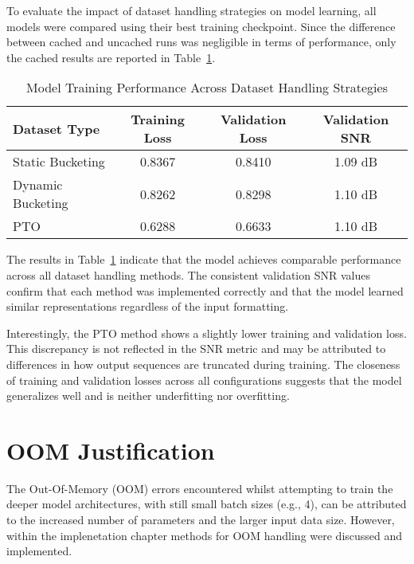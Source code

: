 To evaluate the impact of dataset handling strategies on model learning, all models were compared using their best training checkpoint. Since the difference between cached and uncached runs was negligible in terms of performance, only the cached results are reported in Table~\ref{tab:dataset_performance}.

\vspace{1em}
\begin{table}[H]
\centering
\caption{Model Training Performance Across Dataset Handling Strategies}
\label{tab:dataset_performance}
\begin{tabular}{|l|c|c|c|}
\hline
\textbf{Dataset Type} & \textbf{Training Loss} & \textbf{Validation Loss} & \textbf{Validation SNR} \\
\hline
Static Bucketing  & 0.8367  & 0.8410  & 1.09 dB \\
Dynamic Bucketing & 0.8262  & 0.8298  & 1.10 dB \\  
PTO               & 0.6288  & 0.6633  & 1.10 dB \\
\hline
\end{tabular}
\end{table}

The results in Table~\ref{tab:dataset_performance} indicate that the model achieves comparable performance across all dataset handling methods. The consistent validation SNR values confirm that each method was implemented correctly and that the model learned similar representations regardless of the input formatting.

Interestingly, the PTO method shows a slightly lower training and validation loss. This discrepancy is not reflected in the SNR metric and may be attributed to differences in how output sequences are truncated during training. The closeness of training and validation losses across all configurations suggests that the model generalizes well and is neither underfitting nor overfitting.

\section{OOM Justification}
\label{sec:oom_justification}

The Out-Of-Memory (OOM) errors encountered whilst attempting to train the deeper model architectures, with still small batch sizes (e.g., 4), can be attributed to the increased number of parameters and the larger input data size. However, within the implenetation chapter methods for OOM handling were discussed and implemented.

